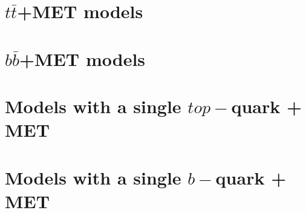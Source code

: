 \section{$t \bar{t}$+MET models}



 \section{$b \bar{b}$+MET models}
 
 

\section{Models with a single $top-$quark + MET}


 
 \section{Models with a single $b-$quark + MET}
 
 

